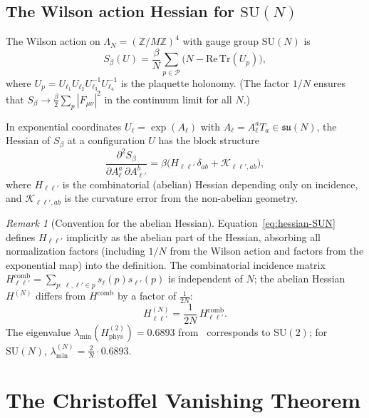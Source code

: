\documentclass[11pt,a4paper]{article}
\theoremstyle{plain}
\theoremstyle{definition}
\theoremstyle{remark}
\newtheorem{remark}[theorem]{Remark}
\newcommand{\Z}{\mathbb{Z}}
\newcommand{\SU}{\mathrm{SU}}
\newcommand{\su}{\mathfrak{su}}
\newcommand{\Tr}{\mathrm{Tr}}
\newcommand{\cK}{\mathcal{K}}
\newcommand{\cP}{\mathcal{P}}
\begin{document}
\subsection{The Wilson action Hessian for $\SU(N)$}

The Wilson action on $\Lambda_N = (\Z/M\Z)^4$ with gauge group
$\SU(N)$ is
\begin{equation}
S_\beta(U) = \frac{\beta}{N}\sum_{p \in \cP}
\bigl(N - \mathrm{Re}\,\Tr(U_p)\bigr),
\end{equation}
where $U_p = U_{\ell_1}U_{\ell_2}U_{\ell_3}^{-1}U_{\ell_4}^{-1}$
is the plaquette holonomy. (The factor $1/N$ ensures that
$S_\beta \to \frac{\beta}{2}\sum_p |F_{\mu\nu}|^2$ in the
continuum limit for all $N$.)

In exponential coordinates $U_\ell = \exp(A_\ell)$ with
$A_\ell = A_\ell^a T_a \in \su(N)$, the Hessian of $S_\beta$ at
a configuration $U$ has the block structure
\begin{equation}\label{eq:hessian-SUN}
\frac{\partial^2 S_\beta}{\partial A_\ell^a\,\partial A_{\ell'}^b}
= \beta\bigl(H_{\ell\ell'}\,\delta_{ab}
+ \cK_{\ell\ell',ab}\bigr),
\end{equation}
where $H_{\ell\ell'}$ is the combinatorial (abelian) Hessian
depending only on incidence, and $\cK_{\ell\ell',ab}$ is the
curvature error from the non-abelian geometry.

\begin{remark}[Convention for the abelian Hessian]\label{rem:H-convention}
Equation~\eqref{eq:hessian-SUN} defines $H_{\ell\ell'}$
implicitly as the abelian part of the Hessian, absorbing all
normalization factors (including $1/N$ from the Wilson action
and factors from the exponential map) into the definition.
The combinatorial incidence matrix
$H^{\mathrm{comb}}_{\ell\ell'} = \sum_{p:\,\ell,\ell'\in p}
s_\ell(p)s_{\ell'}(p)$ is independent of $N$; the abelian
Hessian $H^{(N)}$ differs from $H^{\mathrm{comb}}$ by a factor
of $\frac{1}{2N}$:
\begin{equation}
H^{(N)}_{\ell\ell'}
= \frac{1}{2N}\,H^{\mathrm{comb}}_{\ell\ell'}.
\end{equation}
The eigenvalue $\lambda_{\min}(H^{(2)}_{\mathrm{phys}}) = 0.6893$
from~\cite{Fontes2026Paper8} corresponds to $\SU(2)$; for
$\SU(N)$, $\lambda_{\min}^{(N)} = \frac{2}{N}\cdot 0.6893$.
\end{remark}


\section{The Christoffel Vanishing Theorem}\label{sec:antisym}
\end{document}

